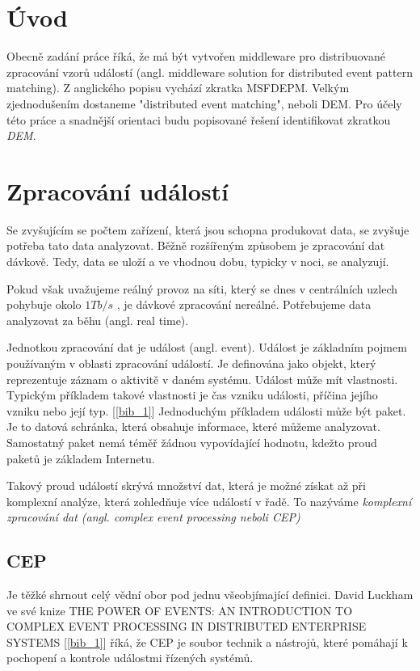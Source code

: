 \documentclass[
  digital, %
  table,   %
  nolof,     %
  nolot,     %
  twoside,
  nocover,
  monochrome,
  12pt
]{fithesis3}
\begin{document}
\chapter{Úvod}

Obecně zadání práce říká, že má být vytvořen middleware pro distribuované zpracování vzorů událostí (angl. middleware solution for distributed event pattern matching). Z anglického popisu vychází zkratka MSFDEPM. Velkým zjednodušením dostaneme "distributed event matching", neboli DEM. Pro účely této práce a snadnější orientaci budu popisované řešení identifikovat zkratkou \textit{DEM}.

\chapter{Zpracování událostí}
Se zvyšujícím se počtem zařízení, která jsou schopna produkovat data, se zvyšuje potřeba tato data analyzovat. Běžně rozšířeným způsobem je zpracování dat dávkově. Tedy, data se uloží a ve vhodnou dobu, typicky v noci, se analyzují.

Pokud však uvažujeme reálný provoz na síti, který se dnes v centrálních uzlech pohybuje okolo $1 Tb/s$ 
, je dávkové zpracování nereálné. Potřebujeme data analyzovat za běhu (angl. real time).

Jednotkou zpracování dat je událost (angl. event). Událost je základním pojmem používaným v oblasti zpracování událostí. Je definována jako objekt, který reprezentuje záznam o aktivitě v daném systému. Událost může mít vlastnosti. Typickým příkladem takové vlastnosti je čas vzniku události, příčina jejího vzniku nebo její typ. [\ref{bib_1}] Jednoduchým příkladem události může být paket. Je to datová schránka, která obsahuje informace, které můžeme analyzovat. Samostatný paket nemá téměř žádnou vypovídající hodnotu, kdežto proud paketů je základem Internetu.

Takový proud událostí skrývá množství dat, která je možné získat až při komplexní analýze, která zohledňuje více událostí v řadě. To nazýváme \textit{komplexní zpracování dat (angl. complex event processing neboli CEP)}


\section{CEP}

Je těžké shrnout celý vědní obor pod jednu všeobjímající definici. David Luckham ve své knize  THE POWER OF EVENTS: AN INTRODUCTION TO COMPLEX EVENT PROCESSING IN DISTRIBUTED ENTERPRISE SYSTEMS [\ref{bib_1}] říká, že CEP je soubor technik a nástrojů, které pomáhají k pochopení a kontrole událostmi řízených systémů.
\end{document}

